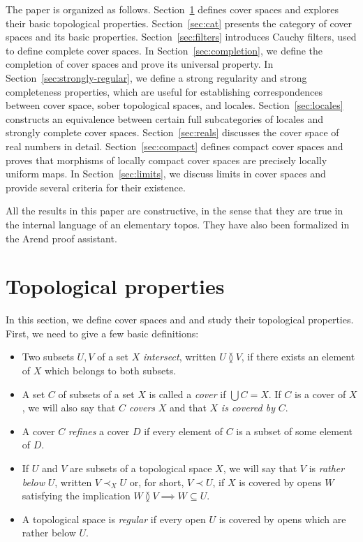 \documentclass[reqno]{amsart}
\theoremstyle{definition}
\theoremstyle{remark}
\numberwithin{figure}{section}
\newcommand{\overlap}[2]{#1 \between #2}
\newcommand{\rb}{\prec}
\begin{document}
The paper is organized as follows.
Section~\ref{sec:top} defines cover spaces and explores their basic topological properties.
Section~\ref{sec:cat} presents the category of cover spaces and its basic properties.
Section~\ref{sec:filters} introduces Cauchy filters, used to define complete cover spaces.
In Section~\ref{sec:completion}, we define the completion of cover spaces and prove its universal property.
In Section~\ref{sec:strongly-regular}, we define a strong regularity and strong completeness properties, which are useful for establishing correspondences between cover space, sober topological spaces, and locales.
Section~\ref{sec:locales} constructs an equivalence between certain full subcategories of locales and strongly complete cover spaces.
Section~\ref{sec:reals} discusses the cover space of real numbers in detail. 
Section~\ref{sec:compact} defines compact cover spaces and proves that morphisms of locally compact cover spaces are precisely locally uniform maps.
In Section~\ref{sec:limits}, we discuss limits in cover spaces and provide several criteria for their existence.

All the results in this paper are constructive, in the sense that they are true in the internal language of an elementary topos.
They have also been formalized in the Arend proof assistant.

\section{Topological properties}
\label{sec:top}

In this section, we define cover spaces and and study their topological properties.
First, we need to give a few basic definitions:
\begin{itemize}
\item Two subsets $U,V$ of a set $X$ \emph{intersect}, written $\overlap{U}{V}$, if there exists an element of $X$ which belongs to both subsets.
\item A set $C$ of subsets of a set $X$ is called a \emph{cover} if $\bigcup C = X$. If $C$ is a cover of $X$, we will also say that $C$ \emph{covers} $X$ and that $X$ \emph{is covered by} $C$.
\item A cover $C$ \emph{refines} a cover $D$ if every element of $C$ is a subset of some element of $D$.
\item If $U$ and $V$ are subsets of a topological space $X$, we will say that $V$ is \emph{rather below} $U$, written $V \rb_X U$ or, for short, $V \rb U$, if $X$ is covered by opens $W$ satisfying the implication $\overlap{W}{V} \implies W \subseteq U$.
\item A topological space is \emph{regular} if every open $U$ is covered by opens which are rather below $U$.
\end{itemize}
\end{document}
